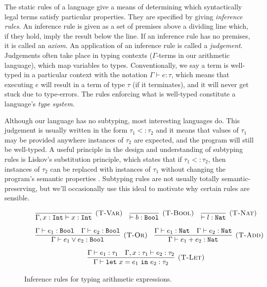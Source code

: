 The static rules of a language give a means of determining which syntactically legal terms satisfy particular properties. They are specified by giving \textit{inference rules}. An inference rule is given as a set of premises above a dividing line which, if they hold, imply the result below the line. If an inference rule has no premises, it is called an \textit{axiom}. An application of an inference rule is called a \textit{judgement}. Judgements often take place in typing contexts ($\Gamma$-terms in our arithmetic language), which map variables to types. Conventionally, we say a term is well-typed in a particular context with the notation $\Gamma \vdash e: \tau$, which means that executing $e$ will result in a term of type $\tau$ (if it terminates), and it will never get stuck due to type-errors. The rules enforcing what is well-typed constitute a language's \textit{type system}.

Although our language has no subtyping, most interesting languages do. This judgement is usually written in the form $\tau_1 <: \tau_2$ and it means that values of $\tau_1$ may be provided anywhere instances of $\tau_2$ are expected, and the program will still be well-typed. A useful principle in the design and understanding of subtyping rules is Liskov's substitution principle, which states that if $\tau_1 <: \tau_2$, then instances of $\tau_2$ can be replaced with instances of $\tau_1$ without changing the program's semantic properties \cite{liskov87}. Subtyping rules are not usually totally semantic-preserving, but we'll occasionally use this ideal to motivate why certain rules are sensible.\\


\begin{figure}[h]

\noindent
{}

\[
\begin{array}{c}

\infer[\textsc{(T-Var)}]
	{\Gamma, x: \kwa{Int} \vdash x: \kwa{Int}}
	{}
~~~
\infer[\textsc{(T-Bool)}]
	{\vdash b : \Bool}
	{}
	~~~
\infer[\textsc{(T-Nat)}]
	{\vdash l : \Nat}
	{}\\[2ex]

	~~~
\infer[\textsc{(T-Or)}]
	{\Gamma \vdash e_1 \lor e_2 : \Bool}
	{\Gamma \vdash e_1: \Bool & \Gamma \vdash e_2: \Bool}
	~~~
\infer[\textsc{(T-Add)}]
	{\Gamma \vdash e_1 + e_2 : \Nat}
	{\Gamma \vdash e_1: \Nat & \Gamma \vdash e_2: \Nat} \\[2ex]
	
\infer[\textsc{(T-Let)}]
	{\Gamma \vdash \letxpr{x}{e_1}{e_2} : \tau_2}
	{\Gamma \vdash e_1: \tau_1 & \Gamma, x: \tau_1 \vdash e_2: \tau_2}
	
	
\end{array}
\]

\vspace{-12pt}
\caption{Inference rules for typing arithmetic expressions.}
\label{A sample. }
\end{figure}

